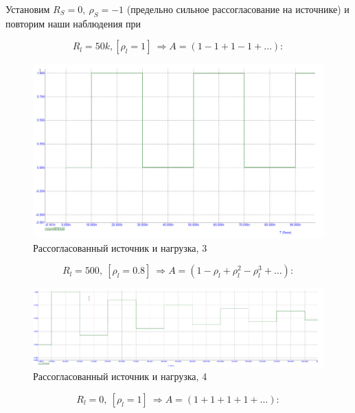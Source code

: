 \documentclass[a4paper, 14pt]{extarticle}%
\begin{document}
Установим $R_{S}=0,\ \rho_{S}=-1$ (предельно сильное рассогласование на источнике) и повторим наши наблюдения при

\[ R_{l}=50 k, \left[\rho_{l}=1\right] \ \Rightarrow A=(1-1+1-1+\ldots) : \]

\begin{figure}[h!]
			\centering
			\includegraphics[width=1.1\linewidth]{./graphs/16.jpg}
			\caption{Рассогласованный источник и нагрузка, 3}
			\label{4.3}
\end{figure}

\[R_{l}=500,\ \left[\rho_{l}=0.8\right] \ \Rightarrow A=\left(1-\rho_{l}+\rho_{l}^{2}-\rho_{l}^{3}+\ldots\right):\]

\begin{figure}[h!]
			\centering
			\includegraphics[width=1.1\linewidth]{./graphs/17.jpg}
			\caption{Рассогласованный источник и нагрузка, 4}
			\label{4.4}
\end{figure}

\[R_{l}=0,\ \left[\rho_{l}=1\right] \ \Rightarrow A=(1+1+1+1+\ldots): \]

\newpage
\end{document}
